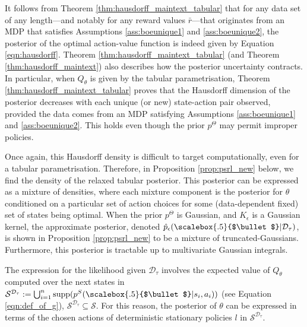 \documentclass{amsart}
\renewcommand{\cdot}[1][.5]{%
  \mathbin{\vcenter{\hbox{\scalebox{#1}{$\bullet$}}}}%
}
\begin{document}
It follows from Theorem \ref{thm:hausdorff_maintext_tabular} that for any data set of any length---and notably for any reward values $\bar{r}$---that originates from an MDP that satisfies Assumptions \ref{ass:boeunique1} and \ref{ass:boeunique2}, the posterior of the optimal action-value function is indeed given by Equation \ref{eqn:hausdorff}. Theorem \ref{thm:hausdorff_maintext_tabular} (and Theorem \ref{thm:hausdorff_maintext}) also describes how the posterior uncertainty contracts. In particular, when $Q_\theta$ is given by the tabular parametrisation, Theorem \ref{thm:hausdorff_maintext_tabular} proves that the Hausdorff dimension of the posterior decreases with each unique (or new) state-action pair observed, provided the data comes from an MDP satisfying Assumptions \ref{ass:boeunique1} and \ref{ass:boeunique2}. This holds even though the prior $p^\Theta$ may permit improper policies.


Once again, this Hausdorff density is difficult to target computationally, even for a tabular parametrisation. Therefore, in Proposition \ref{prop:psrl_new}  below, we find the density of the relaxed tabular posterior. This posterior can be expressed as a mixture of densities, where each mixture component is the posterior for $\theta$ conditioned on a particular set of action choices for some (data-dependent fixed) set of states being optimal. When the prior $p^\Theta$ is Gaussian, and $K_{\epsilon}$ is a Gaussian kernel, the approximate posterior, denoted $\hat{p}_\epsilon(\cdot|\mathcal{D}_\tau)$, is shown in Proposition \ref{prop:psrl_new} to be a mixture of truncated-Gaussians.  Furthermore, this posterior is tractable up to multivariate Gaussian integrals.



 The expression for the likelihood given $\mathcal{D}_\tau$ involves the expected value of {$Q_\theta$} computed over the next states in $\mathcal{S}^{\mathcal{D}_\tau} := \bigcup_{i=1}^n \text{supp}(p^S(\cdot|s_i,a_i))$  (see Equation \ref{eqn:def_of_g}), $\mathcal{S}^{\mathcal{D}_\tau} \subseteq \mathcal{S}$. For this reason, the posterior of $\theta$ can be expressed in terms of the chosen actions of deterministic stationary policies $l$ in  $\mathcal{S}^{\mathcal{D}_\tau}$.
\end{document}
